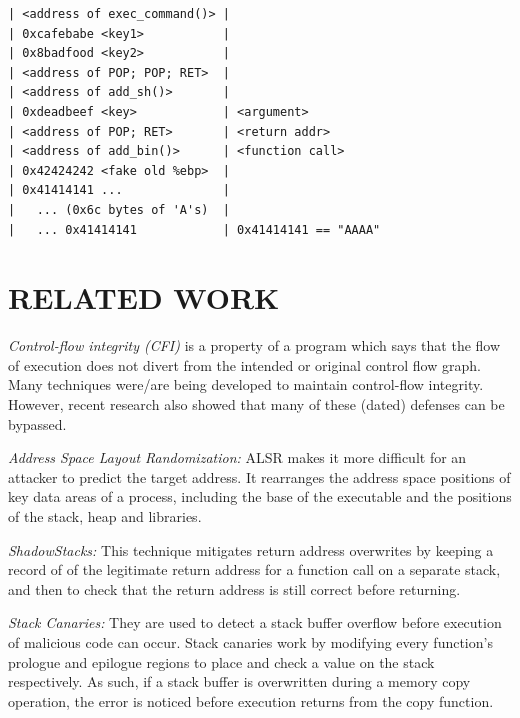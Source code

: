 \documentclass[10pt,twocolumn]{article}
\begin{document}


\begin{lstlisting}[float,aboveskip=\bigskipamount,belowskip=\medskipamount,caption=Stack
prepared with a ROP chain]
| <address of exec_command()> |
| 0xcafebabe <key1>           |
| 0x8badfood <key2>           |
| <address of POP; POP; RET>  |
| <address of add_sh()>       |
| 0xdeadbeef <key>            | <argument>
| <address of POP; RET>       | <return addr>
| <address of add_bin()>      | <function call>
| 0x42424242 <fake old %ebp>  |
| 0x41414141 ...              |
|   ... (0x6c bytes of 'A's)  |
|   ... 0x41414141            | 0x41414141 == "AAAA"
\end{lstlisting}


\section{RELATED WORK}

\textit{Control-flow integrity (CFI)\cite{mulder_subject_2016}} is a property
of a program which says that the flow of execution does not divert from the
intended or original control flow graph. Many techniques were/are being
developed to maintain control-flow integrity. However, recent research also
showed that many of these (dated) defenses can be bypassed.

\textit{Address Space Layout Randomization:} ALSR makes it more difficult for
an attacker to predict the target address. It rearranges the address space
positions of key data areas of a process, including the base of the executable
and the positions of the stack, heap and libraries.

\textit{ShadowStacks:} This technique mitigates return address overwrites by
keeping a record of of the legitimate return address for a function call on a
separate stack, and then to check that the return address is still correct
before returning.

\textit{Stack Canaries:} They are used to detect a stack buffer overflow before
execution of malicious code can occur. Stack canaries work by modifying every
function's prologue and epilogue regions to place and check a value on the
stack respectively. As such, if a stack buffer is overwritten during a memory
copy operation, the error is noticed before execution returns from the copy
function.
\end{document}
